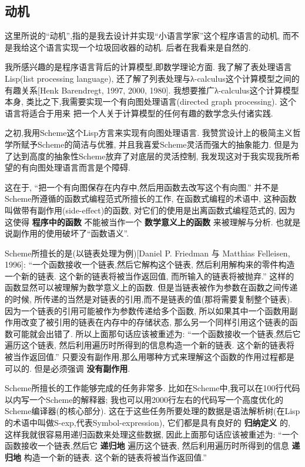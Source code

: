 \documentclass[a4paper]{article}
\begin{document}
\subsection{动机}

这里所说的``动机'',指的是我去设计并实现``小语言学家''这个程序语言的动机,
而不是我给这个语言实现一个垃圾回收器的动机.
后者在我看来是自然的.

我所感兴趣的是程序语言背后的计算模型,即数学理论方面.
我了解了表处理语言Lisp(list processing language),
还了解了列表处理与λ-calculus这个计算模型之间的有趣关系[Henk Barendregt, 1997, 2000, 1980].
我想要推广λ-calculus这个计算模型本身,
类比之下,我需要实现一个有向图处理语言(directed graph processing).
这个语言将适合于用来 把一个人关于计算模型的任何有趣的数学念头付诸实践.

之初,我用Scheme这个Lisp方言来实现有向图处理语言.
我赞赏设计上的极简主义哲学所赋予Scheme的简洁与优雅,
并且我喜爱Scheme灵活而强大的抽象能力.
但是为了达到高度的抽象性Scheme放弃了对底层的灵活控制,
我发现这对于我实现我所希望的有向图处理语言而言是个障碍.

这在于,
``把一个有向图保存在内存中,然后用函数去改写这个有向图.''
并不是Scheme所遵循的函数式编程范式所擅长的工作,
在函数式编程的术语中,
这种函数叫做带有副作用(side-effect)的函数,
对它们的使用是出离函数式编程范式的,
因为这使得 \textbf{程序中的函数} 不能被当作一个 \textbf{数学意义上的函数} 来被理解与分析.
也就是说副作用的使用破坏了``函数语义''.

Scheme所擅长的是(以链表处理为例)[Daniel P. Friedman 与 Matthias Felleisen, 1996]:
``一个函数接收一个链表,然后它解构这个链表,
然后利用解构来的零件构造一个新的链表.
这个新的链表将被当作返回值,
而所输入的链表将被抛弃.''
这样的函数显然可以被理解为数学意义上的函数.
但是当链表被作为参数在函数之间传递的时候,
所传递的当然是对链表的引用,而不是链表的值(那将需要复制整个链表).
因为一个链表的引用可能被作为参数传递给多个函数,
所以如果其中一个函数用副作用改变了被引用的链表在内存中的存储状态,
那么另一个同样引用这个链表的函数可能就会出错了.
所以上面那句话应该被重述为:
``一个函数接收一个链表,然后它遍历这个链表,
然后利用遍历时所得到的信息构造一个新的链表.
这个新的链表将被当作返回值.''
只要没有副作用,那么用哪种方式来理解这个函数的作用过程都是可以的.
但是必须强调 \textbf{没有副作用}.

Scheme所擅长的工作能够完成的任务非常多.
比如在Scheme中,我可以在100行代码以内写一个Scheme的解释器;
我也可以用2000行左右的代码写一个高度优化的Scheme编译器(的核心部分).
这在于这些任务所要处理的数据是语法解析树(在Lisp的术语中叫做S-exp,代表Symbol-expression),
它们都是具有良好的 \textbf{归纳定义} 的,
这样我就很容易用递归函数来处理这些数据,
因此上面那句话应该被重述为:
``一个函数接收一个链表,然后它 \textbf{递归地} 遍历这个链表,
然后利用遍历时所得到的信息 \textbf{递归地} 构造一个新的链表.
这个新的链表将被当作返回值.''
\end{document}
